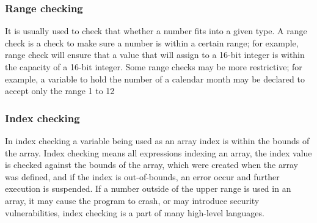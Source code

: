 \documentclass{sig-alternate}
\begin{document}
\subsubsection{Range checking}
It is usually used to check that whether a number fits into a given type. A range check is a check to make sure a number is within a certain range; for example, range check will ensure that a value that will assign to a 16-bit integer is within the capacity of a 16-bit integer. Some range checks may be more restrictive; for example, a variable to hold the number of a calendar month may be declared to accept only the range 1 to 12

\subsubsection{Index checking}
In index checking a variable being used as an array index is within the bounds of the array. Index checking means all expressions indexing an array, the index value is checked against the bounds of the array, which were created when the array was defined, and if the index is out-of-bounds, an error occur and further execution is suspended. If a number outside of the upper range is used in an array, it may cause the program to crash, or may introduce security vulnerabilities, index checking is a part of many high-level languages.
\end{document}
